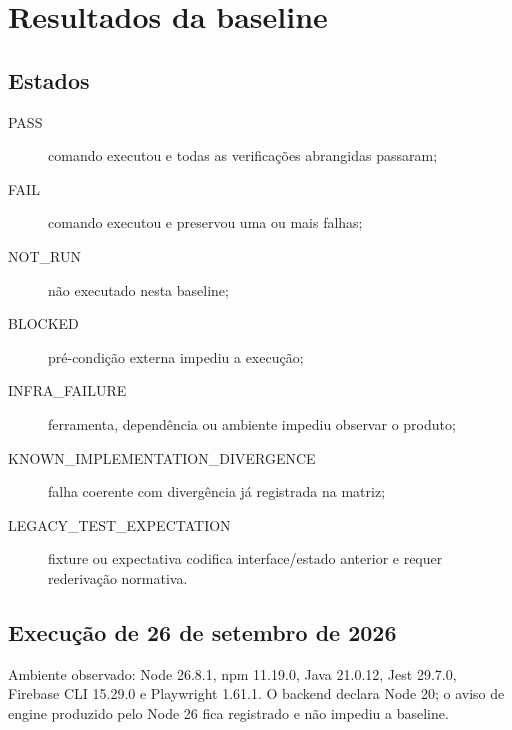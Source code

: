 \section{Resultados da baseline}

\subsection{Estados}

\begin{description}
  \item[PASS] comando executou e todas as verificações abrangidas passaram;
  \item[FAIL] comando executou e preservou uma ou mais falhas;
  \item[NOT\_RUN] não executado nesta baseline;
  \item[BLOCKED] pré-condição externa impediu a execução;
  \item[INFRA\_FAILURE] ferramenta, dependência ou ambiente impediu observar o produto;
  \item[KNOWN\_IMPLEMENTATION\_DIVERGENCE] falha coerente com divergência já registrada na matriz;
  \item[LEGACY\_TEST\_EXPECTATION] fixture ou expectativa codifica interface/estado anterior e requer rederivação normativa.
\end{description}

\subsection{Execução de 26 de setembro de 2026}

Ambiente observado: Node 26.8.1, npm 11.19.0, Java 21.0.12,
Jest 29.7.0, Firebase CLI 15.29.0 e Playwright 1.61.1. O backend declara Node 20;
o aviso de engine produzido pelo Node 26 fica registrado e não impediu a baseline.

